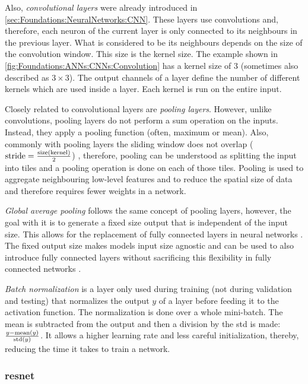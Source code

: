 Also, \emph{convolutional layers} were already introduced in \autoref{sec:Foundations:NeuralNetworks:CNN}. These layers use convolutions and, therefore, each neuron of the current layer is only connected to its neighbours in the previous layer. What is considered to be its neighbours depends on the size of the convolution window. This size is the kernel size. The example shown in \autoref{fig:Foundations:ANNs:CNNs:Convolution} has a kernel size of 3 (sometimes also described as $3 \times 3$). The output channels of a layer define the number of different kernels which are used inside a layer. Each kernel is run on the entire input.

Closely related to convolutional layers are \emph{pooling layers}. However, unlike convolutions, pooling layers do not perform a sum operation on the inputs. Instead, they apply a pooling function (often, maximum or mean). Also, commonly with pooling layers the sliding window does not overlap ($\mathrm{stride} = \frac{\mathrm{size}(\mathrm{kernel})}{2}$) \cite{scherer2010evaluation}, therefore, pooling can be understood as splitting the input into tiles and a pooling operation is done on each of those tiles. Pooling is used to aggregate neighbouring low-level features and to reduce the spatial size of data and therefore requires fewer weights in a network.

\emph{Global average pooling} follows the same concept of pooling layers, however, the goal with it is to generate a fixed size output that is independent of the input size. This allows for the replacement of fully connected layers in neural networks \cite{lin2014network}. The fixed output size makes models input size agnostic and can be used to also introduce fully connected layers without sacrificing this flexibility in fully connected networks \cite{he2016deep}.

\emph{Batch normalization} \cite{ioffe2015batch} is a layer only used during training (not during validation and testing) that normalizes the output $y$ of a layer before feeding it to the activation function. The normalization is done over a whole mini-batch. The mean is subtracted from the output and then a division by the \acf{std} is made: $\frac{y - \mathrm{mean}(y)}{\mathrm{std} (y)}$. It allows a higher learning rate and less careful initialization, thereby, reducing the time it takes to train a network.


\subsubsection{\acs{resnet}}
\label{sec:Foundations:NeuralNetworks:Architecture:ResNet}

